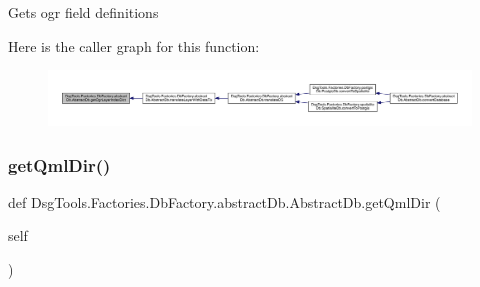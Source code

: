 \begin{DoxyVerb}Gets ogr field definitions
\end{DoxyVerb}
 Here is the caller graph for this function\+:
\nopagebreak
\begin{figure}[H]
\begin{center}
\leavevmode
\includegraphics[width=350pt]{class_dsg_tools_1_1_factories_1_1_db_factory_1_1abstract_db_1_1_abstract_db_a3c0fb949623a1edca9ee934c1643b157_icgraph}
\end{center}
\end{figure}
\mbox{\label{class_dsg_tools_1_1_factories_1_1_db_factory_1_1abstract_db_1_1_abstract_db_a8dcc86de5ba1fb426c1e022b0be14826}} 
\subsubsection{\texorpdfstring{get\+Qml\+Dir()}{getQmlDir()}}
{\footnotesize\ttfamily def Dsg\+Tools.\+Factories.\+Db\+Factory.\+abstract\+Db.\+Abstract\+Db.\+get\+Qml\+Dir (\begin{DoxyParamCaption}\item[{}]{self }\end{DoxyParamCaption})}


